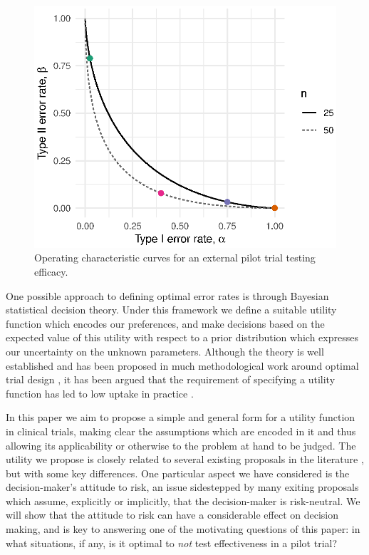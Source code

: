 \documentclass[sagev, Crown]{sagej} %
\begin{document}
\begin{figure}
\centering
\includegraphics[scale=0.8]{./figures/ocs.eps}
\caption{Operating characteristic curves for an external pilot trial testing efficacy.}
\label{fig:ocs}
\end{figure} 

One possible approach to defining optimal error rates is through Bayesian statistical decision theory. Under this framework we define a suitable utility function which encodes our preferences, and make decisions based on the expected value of this utility with respect to a prior distribution which expresses our uncertainty on the unknown parameters. Although the theory is well established \cite{Raiffa1961, Keeney1976, Lindley1997} and has been proposed in much methodological work around optimal trial design \cite{Hee2016}, it has been argued that the requirement of specifying a utility function has led to low uptake in practice \cite{Joseph1997a}. 

In this paper we aim to propose a simple and general form for a utility function in clinical trials, making clear the assumptions which are encoded in it and thus allowing its applicability or otherwise to the problem at hand to be judged. The utility we propose is closely related to several existing proposals in the literature \cite{Pearce2018}, but with some key differences. One particular aspect we have considered is the decision-maker's attitude to risk, an issue sidestepped by many exiting proposals which assume, explicitly or implicitly, that the decision-maker is risk-neutral. We will show that the attitude to risk can have a considerable effect on decision making, and is key to answering one of the motivating questions of this paper: in what situations, if any, is it optimal to \emph{not} test effectiveness in a pilot trial?
\end{document}
